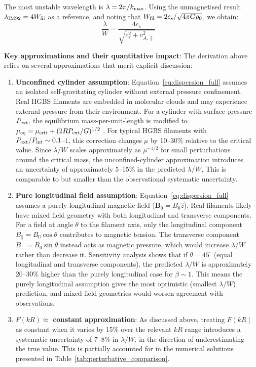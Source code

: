 \documentclass[11pt,a4paper]{article}
\begin{document}
The most unstable wavelength is $\lambda = 2\pi/k_{\rm max}$. Using the unmagnetised result $\lambda_{\rm IM92} = 4W_{\rm fil}$ as a reference, and noting that $W_{\rm fil} = 2c_s/\sqrt{4\pi G\rho_0}$, we obtain:
\begin{equation}
\frac{\lambda}{W} = \frac{4c_s}{\sqrt{c_s^2 + v_{A,\parallel}^2}}
\label{eq:tension_lambda_intermediate}
\end{equation}

\textbf{Key approximations and their quantitative impact}: The derivation above relies on several approximations that merit explicit discussion:

\begin{enumerate}
    \item \textbf{Unconfined cylinder assumption}: Equation~\ref{eq:dispersion_full} assumes an isolated self-gravitating cylinder without external pressure confinement. Real HGBS filaments are embedded in molecular clouds and may experience external pressure from their environment. For a cylinder with surface pressure $P_{\rm ext}$, the equilibrium mass-per-unit-length is modified to $\mu_{\rm eq} = \mu_{\rm crit} + (2R P_{\rm ext}/G)^{1/2}$ \citep{Inutsuka1997}. For typical HGBS filaments with $P_{\rm ext}/P_{\rm int} \sim 0.1$--$1$, this correction changes $\mu$ by 10--30\% relative to the critical value. Since $\lambda/W$ scales approximately as $\mu^{-1/2}$ for small perturbations around the critical mass, the unconfined-cylinder approximation introduces an uncertainty of approximately 5--15\% in the predicted $\lambda/W$. This is comparable to but smaller than the observational systematic uncertainty.

    \item \textbf{Pure longitudinal field assumption}: Equation~\ref{eq:dispersion_full} assumes a purely longitudinal magnetic field ($\mathbf{B}_0 = B_0 \hat{z}$). Real filaments likely have mixed field geometry with both longitudinal and transverse components. For a field at angle $\theta$ to the filament axis, only the longitudinal component $B_{\parallel} = B_0 \cos\theta$ contributes to magnetic tension. The transverse component $B_{\perp} = B_0 \sin\theta$ instead acts as magnetic pressure, which would increase $\lambda/W$ rather than decrease it. Sensitivity analysis shows that if $\theta = 45^\circ$ (equal longitudinal and transverse components), the predicted $\lambda/W$ is approximately 20--30\% higher than the purely longitudinal case for $\beta \sim 1$. This means the purely longitudinal assumption gives the most optimistic (smallest $\lambda/W$) prediction, and mixed field geometries would worsen agreement with observations.

    \item \textbf{$F(kR) \approx$ constant approximation}: As discussed above, treating $F(kR)$ as constant when it varies by 15\% over the relevant $kR$ range introduces a systematic uncertainty of 7--8\% in $\lambda/W$, in the direction of underestimating the true value. This is partially accounted for in the numerical solutions presented in Table~\ref{tab:perturbative_comparison}.
\end{enumerate}
\end{document}
